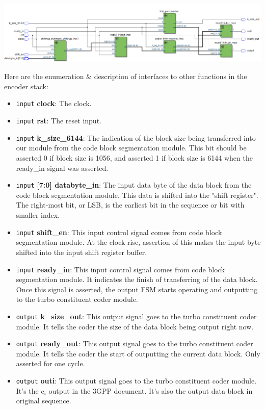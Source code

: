 \documentclass[letterpaper, 12pt]{article} %
\begin{document}
\begin{center}
    \includegraphics[width=\textwidth]{files/rtl_all}
\end{center}
Here are the enumeration \& description of interfaces to other functions in the encoder stack:
\begin{itemize}
    \item \texttt{input} {\bf clock}: The clock.
    \item \texttt{input} {\bf rst}: The reset input.
    \item \texttt{input} {\bf k\_size\_6144}: The indication of the block size being transferred into our module from the code block segmentation module. This bit should be asserted 0 if block size is 1056, and asserted 1 if block size is 6144 when the ready\_in signal was asserted.
    \item \texttt{input} {\bf [7:0] databyte\_in}: The input data byte of the data block from the code block segmentation module. This data is shifted into the "shift register". The right-most bit, or LSB, is the earliest bit in the sequence or bit with smaller index.
    \item \texttt{input} {\bf shift\_en}: This input control signal comes from code block segmentation module. At the clock rise, assertion of this makes the input byte shifted into the input shift register buffer.
    \item \texttt{input} {\bf ready\_in}: This input control signal comes from code block segmentation module. It indicates the finish of transferring of the data block. Once this signal is asserted, the output FSM starts operating and outputting to the turbo constituent coder module.
    \item \texttt{output} {\bf k\_size\_out}: This output signal goes to the turbo constituent coder module. It tells the coder the size of the data block being output right now.
    \item \texttt{output} {\bf ready\_out}: This output signal goes to the turbo constituent coder module. It tells the coder the start of outputting the current data block. Only asserted for one cycle.
    \item \texttt{output} {\bf outi}: This output signal goes to the turbo constituent coder module. It's the c$_i$ output in the 3GPP document. It's also the output data block in original sequence.

\end{itemize}
\end{document}
